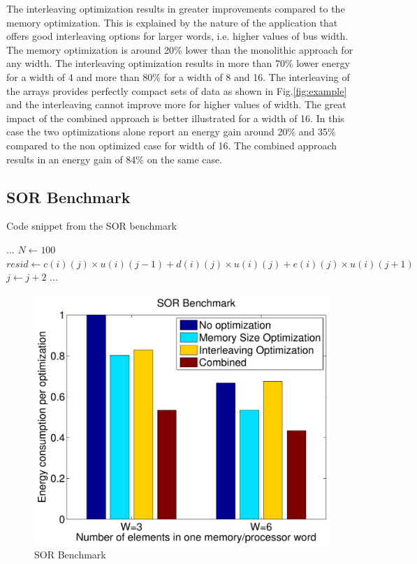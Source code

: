 The interleaving optimization results in greater improvements compared to the memory optimization.
This is explained by the nature of the application that offers good interleaving options for larger words, i.e. higher values of bus width.
The memory optimization is around 20\% lower than the monolithic approach for any width.
The interleaving optimization results in more than 70\% lower energy for a width of 4 and more than 80\% for a width of 8 and 16.
The interleaving of the arrays provides perfectly compact sets of data as shown in Fig.\ref{fig:example} and the interleaving cannot improve more for higher values of width.
The great impact of the combined approach is better illustrated for a width of 16. 
In this case the two optimizations alone report an energy gain around 20\% and 35\% compared to the non optimized case for width of 16.
The combined approach results in an energy gain of 84\% on the same case.

\subsection{SOR Benchmark}

\begin{algorithm}
\caption{Code snippet from the SOR benchmark}
\label{alg:sor}
\begin{algorithmic}[1]
\STATE $...$
\STATE $N \gets 100$
	\STATE $resid \gets c(i)(j) \times u(i)(j-1) + d(i)(j) \times u(i)(j) + e(i)(j) \times u(i)(j+1) $ 	
	\STATE $j \gets j+2$
\ENDFOR	
\STATE $...$
 \end{algorithmic}
\end{algorithm}

\begin{figure}
\centering
	\includegraphics[scale = 0.5]{D/Images/sor.pdf} 
	\caption{SOR Benchmark}
	\label{fig:sor}
\end{figure}

